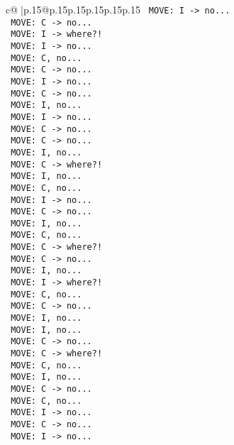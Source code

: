 \documentclass{article}
\begin{document}
{\begin{supertabular}{c@{$\;$}|p{.15\linewidth}@{}p{.15\linewidth}p{.15\linewidth}p{.15\linewidth}p{.15\linewidth}p{.15\linewidth}}
{{{\texttt{ MOVE: I {-}> no...} \\
\texttt{ MOVE: C {-}> no...} \\
\texttt{ MOVE: I {-}> where?!} \\
\texttt{ MOVE: I {-}> no...} \\
\texttt{ MOVE: C, no...} \\
\texttt{ MOVE: C {-}> no...} \\
\texttt{ MOVE: I {-}> no...} \\
\texttt{ MOVE: C {-}> no...} \\
\texttt{ MOVE: I, no...} \\
\texttt{ MOVE: I {-}> no...} \\
\texttt{ MOVE: C {-}> no...} \\
\texttt{ MOVE: C {-}> no...} \\
\texttt{ MOVE: I, no...} \\
\texttt{ MOVE: C {-}> where?!} \\
\texttt{ MOVE: I, no...} \\
\texttt{ MOVE: C, no...} \\
\texttt{ MOVE: I {-}> no...} \\
\texttt{ MOVE: C {-}> no...} \\
\texttt{ MOVE: I, no...} \\
\texttt{ MOVE: C, no...} \\
\texttt{ MOVE: C {-}> where?!} \\
\texttt{ MOVE: C {-}> no...} \\
\texttt{ MOVE: I, no...} \\
\texttt{ MOVE: I {-}> where?!} \\
\texttt{ MOVE: C, no...} \\
\texttt{ MOVE: C {-}> no...} \\
\texttt{ MOVE: I, no...} \\
\texttt{ MOVE: I, no...} \\
\texttt{ MOVE: C {-}> no...} \\
\texttt{ MOVE: C {-}> where?!} \\
\texttt{ MOVE: C, no...} \\
\texttt{ MOVE: I, no...} \\
\texttt{ MOVE: C {-}> no...} \\
\texttt{ MOVE: C, no...} \\
\texttt{ MOVE: I {-}> no...} \\
\texttt{ MOVE: C {-}> no...} \\
\texttt{ MOVE: I {-}> no...} \\
}}}
\end{supertabular}}
\end{document}

